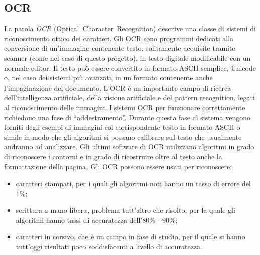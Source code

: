 \subsection{OCR}
	\label{subsec:ocr}
La parola \emph{OCR} (Optical~Character~Recognition) descrive una classe di sistemi di riconoscimento ottico dei caratteri.
Gli OCR sono programmi dedicati alla conversione di un'immagine contenente testo, solitamente acquisite tramite scanner (come nel caso di questo progetto), in testo digitale modificabile con un normale editor. Il testo può essere convertito in formato ASCII semplice, Unicode o, nel caso dei sistemi più avanzati, in un formato contenente anche l'impaginazione del documento.
L'OCR è un importante campo di ricerca dell'intelligenza artificiale, della visione artificiale e del pattern recognition, legati al riconoscimento delle immagini.
I sistemi OCR per funzionare correttamente richiedono una fase di ``addestramento''. Durante questa fase al sistema vengono forniti degli esempi di immagini col corrispondente testo in formato ASCII o simile in modo che gli algoritmi si possano calibrare sul testo che usualmente andranno ad analizzare. Gli ultimi software di OCR utilizzano algoritmi in grado di riconoscere i contorni e in grado di ricostruire oltre al testo anche la formattazione della pagina.
Gli OCR possono essere usati per riconoscere:
\begin{itemize}
	\item caratteri stampati, per i quali gli algoritmi noti hanno un tasso di errore del $1\%$;
	\item scrittura a mano libera, problema tutt'altro che risolto, per la quale gli algoritmi hanno tassi di accuratezza dell'$80\%$ - $90\%$;
	\item caratteri in corsivo, che è un campo in fase di studio, per il quale si hanno tutt'oggi risultati poco soddisfacenti a livello di accuratezza. 
\end{itemize}